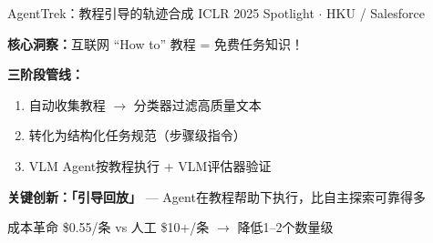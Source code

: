 \documentclass[aspectratio=169, 11pt]{beamer}
\begin{document}
\begin{frame}{AgentTrek：教程引导的轨迹合成}
{\small ICLR 2025 Spotlight $\cdot$ HKU / Salesforce}

\vspace{6pt}
\textbf{核心洞察：}互联网 ``How to'' 教程 = 免费任务知识！

\vspace{8pt}
\textbf{三阶段管线：}
\begin{enumerate}
    \item 自动收集教程 $\rightarrow$ 分类器过滤高质量文本
    \item 转化为结构化任务规范（步骤级指令）
    \item VLM Agent按教程执行 + VLM评估器验证
\end{enumerate}

\vspace{8pt}
\textbf{关键创新：「引导回放」} --- Agent在教程帮助下执行，比自主探索可靠得多

\vspace{10pt}
\begin{block}{成本革命}
\centering \alert{\$0.55/条} \; vs \; 人工 \$10+/条 $\longrightarrow$ 降低1--2个数量级
\end{block}
\end{frame}
\end{document}
